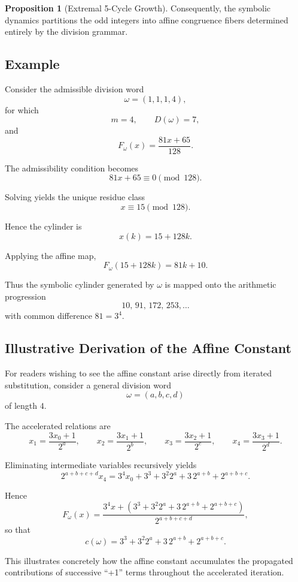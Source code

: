 \documentclass[12pt, oneside]{article}
\numberwithin{equation}{section}
\theoremstyle{definition}
\newtheorem{proposition}{Proposition}[section]
\theoremstyle{plain}
\theoremstyle{remark}
\begin{document}
\begin{proposition}[Extremal 5-Cycle Growth]
Consequently, the symbolic dynamics partitions the odd integers into
affine congruence fibers determined entirely by the division grammar.


\subsection{Example}

Consider the admissible division word
\[
\omega=(1,1,1,4),
\]
for which
\[
m=4,
\qquad
D(\omega)=7,
\]
and
\[
F_\omega(x)=\frac{81x+65}{128}.
\]

The admissibility condition becomes
\[
81x+65\equiv0\pmod{128}.
\]

Solving yields the unique residue class
\[
x\equiv15\pmod{128}.
\]

Hence the cylinder is
\[
x(k)=15+128k.
\]

Applying the affine map,
\[
F_\omega(15+128k)
=
81k+10.
\]

Thus the symbolic cylinder generated by \(\omega\) is mapped onto the
arithmetic progression
\[
10,\,91,\,172,\,253,\dots
\]
with common difference \(81=3^4\).


\subsection{Illustrative Derivation of the Affine Constant}

For readers wishing to see the affine constant arise directly from
iterated substitution, consider a general division word
\[
\omega=(a,b,c,d)
\]
of length \(4\).

The accelerated relations are
\[
x_1=\frac{3x_0+1}{2^a},
\qquad
x_2=\frac{3x_1+1}{2^b},
\qquad
x_3=\frac{3x_2+1}{2^c},
\qquad
x_4=\frac{3x_3+1}{2^d}.
\]

Eliminating intermediate variables recursively yields
\[
2^{a+b+c+d}x_4
=
3^4x_0
+
3^3
+
3^2 2^a
+
3\,2^{a+b}
+
2^{a+b+c}.
\]

Hence
\[
F_\omega(x)
=
\frac{
3^4x
+
\left(
3^3
+
3^2 2^a
+
3\,2^{a+b}
+
2^{a+b+c}
\right)
}{
2^{a+b+c+d}
},
\]
so that
\[
c(\omega)
=
3^3
+
3^2 2^a
+
3\,2^{a+b}
+
2^{a+b+c}.
\]

This illustrates concretely how the affine constant accumulates the
propagated contributions of successive ``+1'' terms throughout the
accelerated iteration.


\end{proposition}
\end{document}
